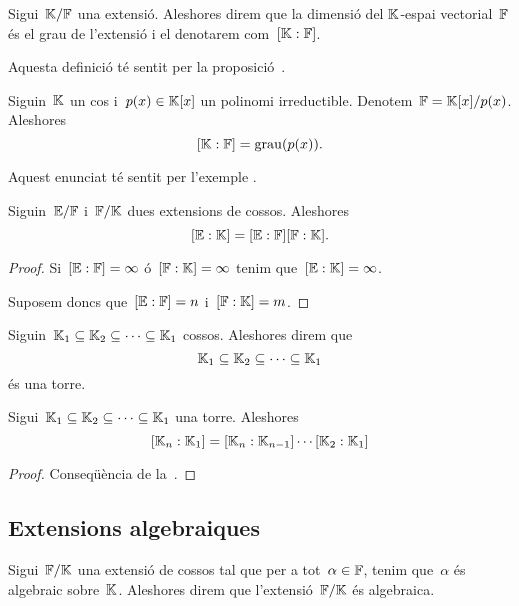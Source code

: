 \documentclass[../Apunts.tex]{subfiles}
\begin{document}
	\begin{definition}
		\label{def:element algebraic}
		\label{def:element transcendent}
		
	\end{definition}
	\begin{definition}
		\label{def:grau d'una extensió}
		Sigui~\(\mathbb{K}/\mathbb{F}\) una extensió. Aleshores direm que la dimensió del \(\mathbb{K}\)-espai vectorial~\(\mathbb{F}\) és el grau de l'extensió i el denotarem com~\([\mathbb{K}:\mathbb{F}]\).
		
		Aquesta definició té sentit per la proposició~.
	\end{definition}
	\begin{example}
		Siguin~\(\mathbb{K}\) un cos i~\(p(x)\in\mathbb{K}[x]\) un polinomi irreductible. Denotem~\(\mathbb{F}=\mathbb{K}[x]/p(x)\). Aleshores
		\[[\mathbb{K}:\mathbb{F}]=\operatorname{grau}(p(x)).\]
		\begin{solution}
			Aquest enunciat té sentit per l'exemple . %
		\end{solution}
	\end{example}
	\begin{theorem}
		\label{thm:fórmula de les torres}
		Siguin~\(\mathbb{E}/\mathbb{F}\) i~\(\mathbb{F}/\mathbb{K}\) dues extensions de cossos. Aleshores
		\[[\mathbb{E}:\mathbb{K}]=[\mathbb{E}:\mathbb{F}][\mathbb{F}:\mathbb{K}].\]
		\begin{proof}
			Si~\([\mathbb{E}:\mathbb{F}]=\infty\) ó~\([\mathbb{F}:\mathbb{K}]=\infty\) tenim que~\([\mathbb{E}:\mathbb{K}]=\infty\).
			
			Suposem doncs que~\([\mathbb{E}:\mathbb{F}]=n\) i~\([\mathbb{F}:\mathbb{K}]=m\). %
		\end{proof}
	\end{theorem}
	\begin{definition}[Torre]
		\label{def:torre de cossos}
		Siguin~\(\mathbb{K}_{1}\subseteq\mathbb{K}_{2}\subseteq\dots\subseteq\mathbb{K}_{1}\) cossos. Aleshores direm que
		\[\mathbb{K}_{1}\subseteq\mathbb{K}_{2}\subseteq\dots\subseteq\mathbb{K}_{1}\]
		és una torre.
	\end{definition}
	\begin{corollary}
		\label{cor:fórmula de les torres}
		Sigui~\(\mathbb{K}_{1}\subseteq\mathbb{K}_{2}\subseteq\dots\subseteq\mathbb{K}_{1}\) una torre. Aleshores
		\[[\mathbb{K}_{n}:\mathbb{K}_{1}]=[\mathbb{K}_{n}:\mathbb{K}_{n-1}]\cdots[\mathbb{K}_{2}:\mathbb{K}_{1}]\]
		\begin{proof}
			Conseqüència de la~.
		\end{proof}
	\end{corollary}
	\subsection{Extensions algebraiques}
	\begin{definition}
		Sigui~\(\mathbb{F}/\mathbb{K}\) una extensió de cossos tal que per a tot~\(\alpha\in\mathbb{F}\), tenim que~\(\alpha\) és algebraic sobre~\(\mathbb{K}\). Aleshores direm que l'extensió~\(\mathbb{F}/\mathbb{K}\) és algebraica.
	\end{definition}
\end{document}

